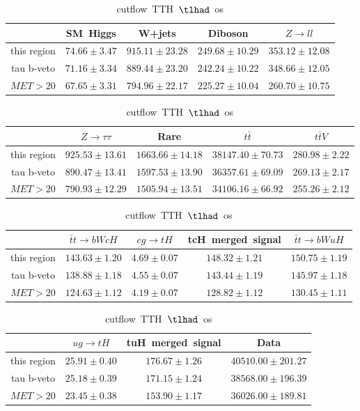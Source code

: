 \begin{table}
\footnotesize
\caption{cutflow~TTH~$\tlhad$~os}
\centering
\begin{tabular}{|c|c|c|c|c|} \hline
 & SM~Higgs & W+jets & Diboson & $Z\to ll$\\\hline
this region & $74.66\pm3.47$ & $915.11\pm23.28$ & $249.68\pm10.29$ & $353.12\pm12.08$\\\hline
tau b-veto & $71.16\pm3.34$ & $889.44\pm23.20$ & $242.24\pm10.22$ & $348.66\pm12.05$\\\hline
$MET>20$ & $67.65\pm3.31$ & $794.96\pm22.17$ & $225.27\pm10.04$ & $260.70\pm10.75$\\\hline
\end{tabular}
\begin{tabular}{|c|c|c|c|c|} \hline
 & $Z\to \tau\tau$ & Rare & $t\bar{t}$ & $t\bar{t}V$\\\hline
this region & $925.53\pm13.61$ & $1663.66\pm14.18$ & $38147.40\pm70.73$ & $280.98\pm2.22$\\\hline
tau b-veto & $890.47\pm13.41$ & $1597.53\pm13.90$ & $36357.61\pm69.09$ & $269.13\pm2.17$\\\hline
$MET>20$ & $790.93\pm12.29$ & $1505.94\pm13.51$ & $34106.16\pm66.92$ & $255.26\pm2.12$\\\hline
\end{tabular}
\begin{tabular}{|c|c|c|c|c|} \hline
 & $\bar{t}t\to bWcH$ & $cg\to tH$ & tcH~merged~signal & $\bar{t}t\to bWuH$\\\hline
this region & $143.63\pm1.20$ & $4.69\pm0.07$ & $148.32\pm1.21$ & $150.75\pm1.19$\\\hline
tau b-veto & $138.88\pm1.18$ & $4.55\pm0.07$ & $143.44\pm1.19$ & $145.97\pm1.18$\\\hline
$MET>20$ & $124.63\pm1.12$ & $4.19\pm0.07$ & $128.82\pm1.12$ & $130.45\pm1.11$\\\hline
\end{tabular}
\begin{tabular}{|c|c|c|c|} \hline
 & $ug\to tH$ & tuH~merged~signal & Data\\\hline
this region & $25.91\pm0.40$ & $176.67\pm1.26$ & $40510.00\pm201.27$\\\hline
tau b-veto & $25.18\pm0.39$ & $171.15\pm1.24$ & $38568.00\pm196.39$\\\hline
$MET>20$ & $23.45\pm0.38$ & $153.90\pm1.17$ & $36026.00\pm189.81$\\\hline
\end{tabular}
\label{tab:cutflow_reg1l1tau1b3j_os}
\end{table}
